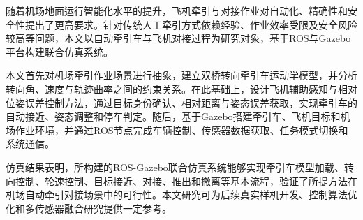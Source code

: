 \begin{abstractzh}

随着机场地面运行智能化水平的提升，飞机牵引与对接作业对自动化、精确性和安全性提出了更高要求。针对传统人工牵引方式依赖经验、作业效率受限及安全风险较高等问题，本文以自动牵引车与飞机对接过程为研究对象，基于ROS与Gazebo平台构建联合仿真系统。

本文首先对机场牵引作业场景进行抽象，建立双桥转向牵引车运动学模型，并分析转向角、速度与轨迹曲率之间的约束关系。在此基础上，设计飞机辅助感知与相对位姿误差控制方法，通过目标身份确认、相对距离与姿态误差获取，实现牵引车的自动接近、姿态调整和停车判定。随后，基于Gazebo搭建牵引车、飞机目标和机场作业环境，并通过ROS节点完成车辆控制、传感器数据获取、任务模式切换和系统通信。

仿真结果表明，所构建的ROS-Gazebo联合仿真系统能够实现牵引车模型加载、转向控制、轮速控制、目标接近、对接、推出和撤离等基本流程，验证了所提方法在机场自动牵引对接场景中的可行性。本文研究可为后续真实样机开发、控制算法优化和多传感器融合研究提供一定参考。

\end{abstractzh}
